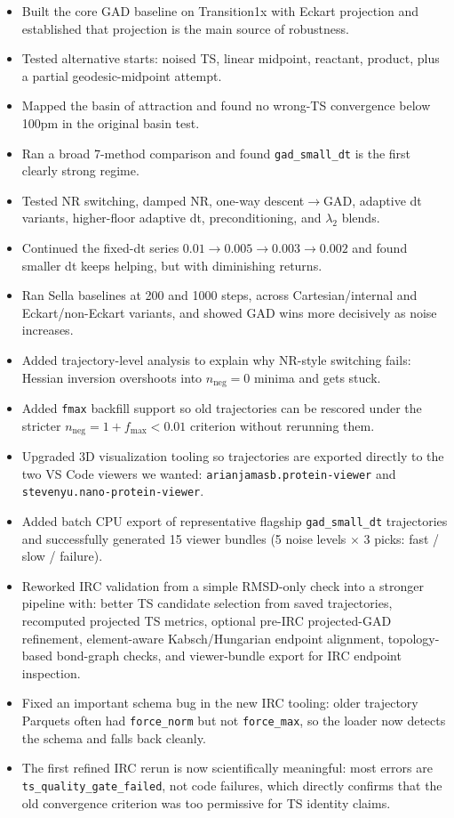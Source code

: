 \documentclass[11pt]{article}
\begin{document}
\begin{itemize}[nosep,leftmargin=1.5em]
\item Built the core GAD baseline on Transition1x with Eckart projection and established that projection is the main source of robustness.
\item Tested alternative starts: noised TS, linear midpoint, reactant, product, plus a partial geodesic-midpoint attempt.
\item Mapped the basin of attraction and found no wrong-TS convergence below 100pm in the original basin test.
\item Ran a broad 7-method comparison and found \texttt{gad\_small\_dt} is the first clearly strong regime.
\item Tested NR switching, damped NR, one-way descent$\to$GAD, adaptive dt variants, higher-floor adaptive dt, preconditioning, and $\lambda_2$ blends.
\item Continued the fixed-dt series $0.01 \to 0.005 \to 0.003 \to 0.002$ and found smaller dt keeps helping, but with diminishing returns.
\item Ran Sella baselines at 200 and 1000 steps, across Cartesian/internal and Eckart/non-Eckart variants, and showed GAD wins more decisively as noise increases.
\item Added trajectory-level analysis to explain why NR-style switching fails: Hessian inversion overshoots into $n_{\text{neg}}=0$ minima and gets stuck.
\item Added \texttt{fmax} backfill support so old trajectories can be rescored under the stricter $n_{\text{neg}}=1 + f_{\max}<0.01$ criterion without rerunning them.
\item Upgraded 3D visualization tooling so trajectories are exported directly to the two VS Code viewers we wanted:
  \texttt{arianjamasb.protein-viewer} and \texttt{stevenyu.nano-protein-viewer}.
\item Added batch CPU export of representative flagship \texttt{gad\_small\_dt} trajectories and successfully generated 15 viewer bundles
  (5 noise levels $\times$ 3 picks: fast / slow / failure).
\item Reworked IRC validation from a simple RMSD-only check into a stronger pipeline with:
  better TS candidate selection from saved trajectories,
  recomputed projected TS metrics,
  optional pre-IRC projected-GAD refinement,
  element-aware Kabsch/Hungarian endpoint alignment,
  topology-based bond-graph checks,
  and viewer-bundle export for IRC endpoint inspection.
\item Fixed an important schema bug in the new IRC tooling: older trajectory Parquets often had \texttt{force\_norm} but not \texttt{force\_max}, so the loader now detects the schema and falls back cleanly.
\item The first refined IRC rerun is now scientifically meaningful: most errors are \texttt{ts\_quality\_gate\_failed}, not code failures, which directly confirms that the old convergence criterion was too permissive for TS identity claims.
\end{itemize}
\end{document}
